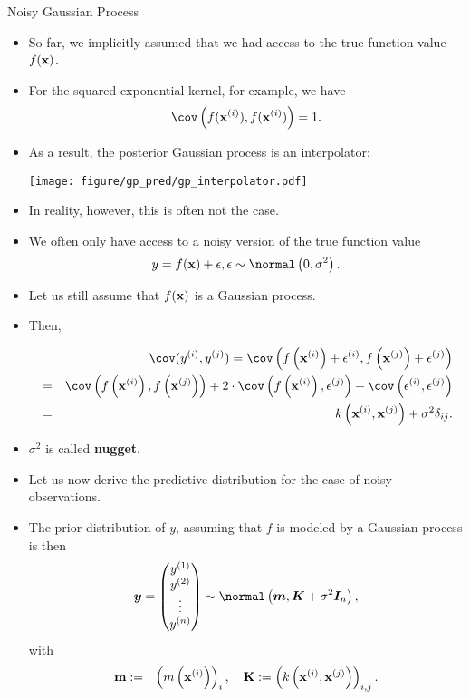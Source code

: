 \documentclass[11pt,compress,t,notes=noshow, xcolor=table]{beamer}
\begin{document}
\begin{vbframe}{Noisy Gaussian Process}

\begin{itemize}
  \item So far, we implicitly assumed that we had access to the true function value $f(\mathbf{x})$.
  \item For the squared exponential kernel, for example, we have
  $$
    \cov\left(f(\xi), f(\xi)\right) = 1.
  $$
  \item As a result, the posterior Gaussian process is an interpolator: 
  \begin{center}
    \texttt{[image: figure/gp\_pred/gp\_interpolator.pdf]}
  \end{center}

\framebreak 

  \item In reality, however, this is often not the case. 
  \item We often only have access to a noisy version of the true function value
  $$
    y = \fx + \eps, \eps \sim\normal\left(0, \sigma^2\right).
  $$
  \item Let us still assume that $f(\mathbf{x})$ is a Gaussian process.
  \item Then,
  \begin{footnotesize} 
  \begin{eqnarray*}
    &&\cov(y^{(i)}, y^{(j)}) = \cov\left(f\left(\xi\right) + \epsilon^{(i)}, f\left(\xi[j]\right) + \epsilon^{(j)}\right) \\
    &=& \cov\left(f\left(\xi\right), f\left(\xi[j]\right)\right) + 2 \cdot \cov\left(f\left(\xi\right), \epsilon^{(j)}\right) + \cov\left(\epsilon^{(i)}, \epsilon^{(j)}\right) 
    \\ &=& k\left(\xi, \xi[j]\right) + \sigma^2 \delta_{ij}. 
  \end{eqnarray*}
  \end{footnotesize}
  \item $\sigma^2$ is called \textbf{nugget}. 
\end{itemize}

\framebreak 

\begin{itemize}
  \item Let us now derive the predictive distribution for the case of noisy observations. 
  \item The prior distribution of $y$, assuming that $f$ is modeled by a Gaussian process is then
  $$
    \bm{y} = \begin{pmatrix} \yi[1] \\ \yi[2] \\ \vdots \\ \yi[n] \end{pmatrix} \sim \normal\left(\bm{m}, \bm{K} + \sigma^2 \bm{I}_n \right),
  $$
  with 
  \begin{eqnarray*}
    \textbf{m} &:=& \left(m\left(\mathbf{x}^{(i)}\right)\right)_{i}, \quad
    \textbf{K} := \left(k\left(\mathbf{x}^{(i)}, \mathbf{x}^{(j)}\right)\right)_{i,j}. 
  \end{eqnarray*}


\end{itemize}
\end{vbframe}
\end{document}
